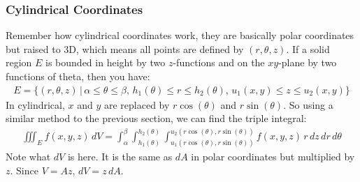 \documentclass{article}
\begin{document}
\subsubsection{Cylindrical Coordinates}
Remember how cylindrical coordinates work, they are basically polar coordinates but raised to 3D, which means all points are defined by $(r,\theta, z)$. If a solid region $E$ is bounded in height by two $z$-functions and on the $xy$-plane by two functions of theta, then you have:
\begin{gather*}
    E = \bigg\{(r,\theta, z)\,|\, \alpha \leqslant \theta \leqslant \beta, \, h_1(\theta) \leqslant r \leqslant h_2(\theta),\, u_1(x,y) \leqslant z \leqslant u_2(x,y)\bigg\}
\end{gather*}
In cylindrical, $x$ and $y$ are replaced by $r\cos(\theta)$ and $r\sin(\theta)$. So using a similar method to the previous section, we can find the triple integral:
\begin{gather*}
    \iiint_E f(x,y,z) \, dV = \int_\alpha^\beta \int_{h_1(\theta)}^{h_2(\theta)}\int_{u_1(r\cos(\theta),r\sin(\theta))}^{u_2(r\cos(\theta),r\sin(\theta))} f(x,y,z) \,r \, dz\,dr\,d\theta
\end{gather*}
Note what $dV$ is here. It is the same as $dA$ in polar coordinates but multiplied by $z$. Since $V = Az$, $dV = z\,dA$.
\end{document}
